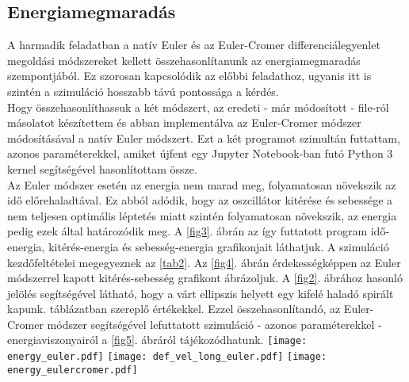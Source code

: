 \begin{multicols}{2}
\subsection{Energiamegmaradás}
A harmadik feladatban a natív Euler és az Euler-Cromer differenciálegyenlet megoldási módszereket kellett összehasonlítanunk az energiamegmaradás szempontjából. Ez szorosan kapcsolódik az előbbi feladathoz, ugyanis itt is szintén a szimuláció hosszabb távú pontossága a kérdés. \\
Hogy összehasonlíthassuk a két módszert, az eredeti - már módosított - file-ról másolatot készítettem és abban implementálva az Euler-Cromer módszer módosításával a natív Euler módszert. Ezt a két programot szimultán futtattam, azonos paraméterekkel, amiket újfent egy Jupyter Notebook-ban futó Python 3 kernel segítségével hasonlítottam össze. \\
Az Euler módszer esetén az energia nem marad meg, folyamatosan növekszik az idő előrehaladtával. Ez abból adódik, hogy az oszcillátor kitérése és sebessége a nem teljesen optimális léptetés miatt szintén folyamatosan növekszik, az energia pedig ezek által határozódik meg. A \ref{fig3}. ábrán az így futtatott program idő-energia, kitérés-energia és sebesség-energia grafikonjait láthatjuk. A szimuláció kezdőfeltételei megegyeznek az \ref{tab2}. Az \ref{fig4}. ábrán érdekességképpen az Euler módszerrel kapott kitérés-sebesség grafikont ábrázoljuk. A \ref{fig2}. ábrához hasonló jelölés segítségével látható, hogy a várt ellipszis helyett egy kifelé haladó spirált kapunk. táblázatban szereplő értékekkel. Ezzel összehasonlítandó, az Euler-Cromer módszer segítségével lefuttatott szimuláció - azonos paraméterekkel - energiaviszonyairól a \ref{fig5}. ábráról tájékozódhatunk.
\hfill \break \hfill \break
{\centering\texttt{[image: energy\_euler.pdf]}}
\label{fig3}
\hfill \break \hfill \break
{\centering\texttt{[image: def\_vel\_long\_euler.pdf]}}
\label{fig4}
\hfill \break \hfill \break
{\centering\texttt{[image: energy\_eulercromer.pdf]}}
\label{fig5}


\end{multicols}
